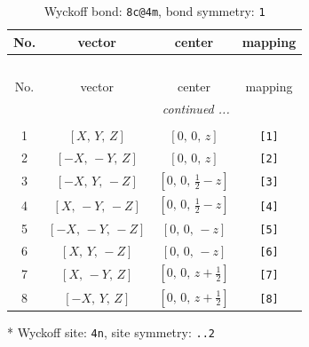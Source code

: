 \documentclass[fleqn,8pt]{jsarticle}
\begin{document}
\renewcommand{\arraystretch}{1.2}
\begin{longtable}{cccc}
\caption{Wyckoff bond: {\tt 8c@4m}, bond symmetry: {\tt 1}}
 \\
 \hline \hline
No. & vector & center & mapping \\ \hline \endfirsthead

\multicolumn{3}{l}{\tablename\ \thetable{}} \\
 \hline \hline
No. & vector & center & mapping \\ \hline \endhead

 \hline \hline
\multicolumn{3}{r}{\footnotesize\it continued ...} \\ \endfoot

 \hline \hline
\multicolumn{3}{r}{} \\ \endlastfoot

1 & $\left[ X,\, Y,\, Z \right]$ & $\left[ 0,\, 0,\, z \right]$ & {\tt [1]} \\ \hline
2 & $\left[ - X,\, - Y,\, Z \right]$ & $\left[ 0,\, 0,\, z \right]$ & {\tt [2]} \\ \hline
3 & $\left[ - X,\, Y,\, - Z \right]$ & $\left[ 0,\, 0,\, \frac{1}{2} - z \right]$ & {\tt [3]} \\ \hline
4 & $\left[ X,\, - Y,\, - Z \right]$ & $\left[ 0,\, 0,\, \frac{1}{2} - z \right]$ & {\tt [4]} \\ \hline
5 & $\left[ - X,\, - Y,\, - Z \right]$ & $\left[ 0,\, 0,\, - z \right]$ & {\tt [5]} \\ \hline
6 & $\left[ X,\, Y,\, - Z \right]$ & $\left[ 0,\, 0,\, - z \right]$ & {\tt [6]} \\ \hline
7 & $\left[ X,\, - Y,\, Z \right]$ & $\left[ 0,\, 0,\, z + \frac{1}{2} \right]$ & {\tt [7]} \\ \hline
8 & $\left[ - X,\, Y,\, Z \right]$ & $\left[ 0,\, 0,\, z + \frac{1}{2} \right]$ & {\tt [8]} \\
\end{longtable}
* Wyckoff site: {\tt 4n}, site symmetry: {\tt ..2}
\renewcommand{\arraystretch}{1.2}
\end{document}

